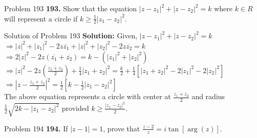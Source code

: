 \documentclass[aspectratio=169,8pt]{beamer}
\begin{document}
\begin{frame}{Problem 193}
  \textbf{193.} Show that the equation $|z - z_1|^2 + |z - z_2|^2 = k$ where $k\in R$ will
  represent a circle if $k\geq \frac{1}{2}|z_1 - z_2|^2$.
\end{frame}
\begin{frame}{Solution of Problem 193}
  \textbf{Solution:} Given, $|z - z_1|^2 + |z - z_2|^2 = k$\\
  \vspace*{0.2cm}
  $\Rightarrow |z|^2 + |z_1|^2 - 2z\overline{z_1} + |z|^2 + |z_2|^2 - 2z\overline{z_2} = k$\\
  \vspace*{0.2cm}
  $\Rightarrow 2|z|^2 - 2z(\overline{z_1} + \overline{z_2}) = k - (|z_1|^2 + |z_2|^2)$\\
  \vspace*{0.2cm}
  $\Rightarrow |z|^2 - 2z\left(\frac{\overline{z_1 + z_2}}{2}\right) + \frac{1}{4}|z_1 + z_2|^2 = \frac{k}{2} + \frac{1}{4}[|z_1 + z_2|^2 - 2|z_1|^2 -2|z_2|^2]$\\
  $\Rightarrow \left|z - \frac{z_1 + z_2}{2}\right|^2 = \frac{1}{2}\left[k - \frac{1}{2}|z_1 - z_2|^2\right]$\\
  \vspace*{0.2cm}
  The above equation represents a circle with center at $\frac{z_1 + z_2}{2}$ and radius $\frac{1}{2}\sqrt{2k - |z_1 - z_2|^2}$
  provided $k\geq \frac{|z_1 - z_2|^2}{2}$.
\end{frame}
\begin{frame}{Problem 194}
  \textbf{194.} If $|z - 1| = 1$, prove that $\frac{z - 2}{z} = i\tan[\arg(z)]$.
\end{frame}
\end{document}
